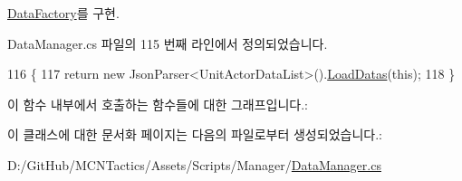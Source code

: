 \hyperlink{class_data_factory_a8ed29ae4a917c15aa824bb7f56418cbf}{Data\+Factory}를 구현.



Data\+Manager.\+cs 파일의 115 번째 라인에서 정의되었습니다.


\begin{DoxyCode}
116     \{
117         \textcolor{keywordflow}{return} \textcolor{keyword}{new} JsonParser<UnitActorDataList>().\hyperlink{class_unit_actor_data_factory_af2d10cba13fca1669a50705e828cd475}{LoadDatas}(\textcolor{keyword}{this});
118     \}
\end{DoxyCode}


이 함수 내부에서 호출하는 함수들에 대한 그래프입니다.\+:




이 클래스에 대한 문서화 페이지는 다음의 파일로부터 생성되었습니다.\+:\begin{DoxyCompactItemize}
\item 
D\+:/\+Git\+Hub/\+M\+C\+N\+Tactics/\+Assets/\+Scripts/\+Manager/\hyperlink{_data_manager_8cs}{Data\+Manager.\+cs}\end{DoxyCompactItemize}
